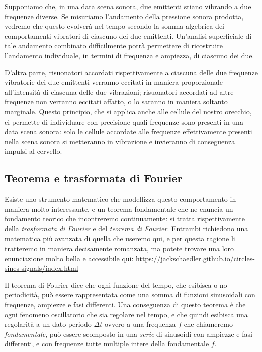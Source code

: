 \documentclass[11pt]{report}
\begin{document}
Supponiamo che, in una data scena sonora, due emittenti stiano vibrando a due frequenze diverse. Se misuriamo l'andamento della pressione sonora prodotta, vedremo che questo evolverà nel tempo secondo la somma algebrica dei comportamenti vibratori di ciascuno dei due emittenti. Un'analisi superficiale di tale andamento combinato difficilmente potrà permettere di ricostruire l'andamento individuale, in termini di frequenza e ampiezza, di ciascuno dei due.

D'altra parte, risuonatori accordati rispettivamente a ciascuna delle due frequenze vibratorie dei due emittenti verranno eccitati in maniera proporzionale all'intensità di ciascuna delle due vibrazioni; risuonatori accordati ad altre frequenze non verranno eccitati affatto, o lo saranno in maniera soltanto marginale. Questo principio, che si applica anche alle cellule del nostro orecchio, ci permette di individuare con precisione quali frequenze sono presenti in una data scena sonora: solo le cellule accordate alle frequenze effettivamente presenti nella scena sonora si metteranno in vibrazione e invieranno di conseguenza impulsi al cervello.


\subsection{Teorema e trasformata di Fourier}

Esiste uno strumento matematico che modellizza questo comportamento in maniera molto interessante, e un teorema fondamentale che ne enuncia un fondamento teorico che incontreremo continuamente: si tratta rispettivamente della \emph{trasformata di Fourier} e del \emph{teorema di Fourier}. Entrambi richiedono una matematica più avanzata di quella che useremo qui, e per questa ragione li tratteremo in maniera decisamente romanzata, ma potete trovare una loro enunciazione molto bella e accessibile qui: \url{https://jackschaedler.github.io/circles-sines-signals/index.html}

Il teorema di Fourier dice che ogni funzione del tempo, che esibisca o no periodicità, può essere rappresentata come una somma di funzioni sinusoidali con frequenze, ampiezze e fasi differenti. Una conseguenza di questo teorema è che ogni fenomeno oscillatorio che sia regolare nel tempo, e che quindi esibisca una regolarità a un dato periodo $\Delta t$ ovvero a una frequenza $f$ che chiameremo \emph{fondamentale}, può essere scomposto in una \emph{serie} di sinusoidi con ampiezze e fasi differenti, e con frequenze tutte multiple intere della fondamentale $f$.
\end{document}
